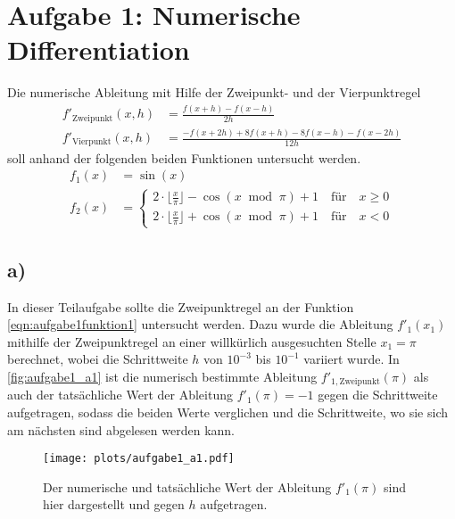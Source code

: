 \newpage
\section{Aufgabe 1: Numerische Differentiation}
  \label{sec:auf1}
  Die numerische Ableitung mit Hilfe der Zweipunkt- und der Vierpunktregel
  \begin{align}
    f'_{\mathrm{Zweipunkt}}(x,h) &= \frac{f(x+h) - f(x-h)}{2h} \\[10pt]
    f'_{\mathrm{Vierpunkt}}(x,h) &= \frac{-f(x+2h) + 8f(x+h) - 8f(x-h) - f(x-2h)}{12h}
  \end{align}
  soll anhand der folgenden beiden Funktionen untersucht werden.
  \begin{align}
    \label{eqn:aufgabe1funktion1}
    f_1(x) &= \sin(x)\\[2pt]
    \label{eqn:aufgabe1funktion2}
    f_2(x) &= \left\{
      \begin{matrix}
        2\cdot \lfloor\frac{x}{\pi} \rfloor -\cos(x \;\;\text{mod}\;\; \pi) + 1 \quad \text{für} \quad x \geq 0 \\[5pt]
        2\cdot \lfloor\frac{x}{\pi} \rfloor +\cos(x \;\;\text{mod}\;\; \pi) + 1 \quad \text{für} \quad x < 0
      \end{matrix}
      \right.
  \end{align}

  \subsection{a)}
    In dieser Teilaufgabe sollte die Zweipunktregel an der Funktion \ref{eqn:aufgabe1funktion1} untersucht werden.
    Dazu wurde die Ableitung $f'_1(x_1)$ mithilfe der Zweipunktregel an einer willkürlich ausgesuchten Stelle $x_1 = \pi$ berechnet, wobei die Schrittweite $h$ von $10^{-3}$ bis $10^{-1}$ variiert wurde.
    In \autoref{fig:aufgabe1_a1} ist die numerisch bestimmte Ableitung $f'_{\mathrm{1,Zweipunkt}}(\pi)$ als auch der tatsächliche Wert der Ableitung $f'_1(\pi) = -1$ gegen die Schrittweite aufgetragen, sodass die beiden Werte verglichen und die Schrittweite, wo sie sich am nächsten sind abgelesen werden kann.
    
    \begin{figure}[ht]
      \centering
      \texttt{[image: plots/aufgabe1\_a1.pdf]} \vspace*{-0.6cm}
      \caption{Der numerische und tatsächliche Wert der Ableitung $f'_1(\pi)$ sind hier dargestellt und gegen $h$ aufgetragen.}
      \label{fig:aufgabe1_a1}
    \end{figure}
    \FloatBarrier


